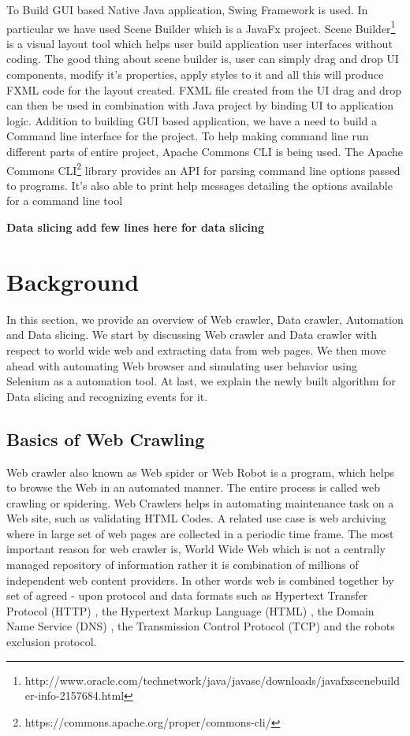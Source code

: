 \documentclass[article,type=msc,colorback,accentcolor=tud9c,twoside,11pt]{tudthesis}
\begin{document}
To Build GUI based Native Java application, Swing Framework is used. In particular we have used Scene Builder which is a JavaFx\cite{JavaFx} project. Scene Builder\footnote{http://www.oracle.com/technetwork/java/javase/downloads/javafxscenebuilder-info-2157684.html} is a visual layout tool which helps user build application user interfaces without coding. The good thing about scene builder is, user can simply drag and drop UI components, modify it's properties, apply styles to it and all this will produce FXML code for the layout created. FXML file created from the UI drag and drop can then be used in combination with Java project by binding UI to application logic. Addition to building GUI based application, we have a need to build a Command line interface for the project. To help making command line run different parts of entire project, Apache Commons CLI is being used. The Apache Commons CLI\footnote{https://commons.apache.org/proper/commons-cli/} library provides an API for parsing command line options passed to programs. It's also able to print help messages detailing the options available for a command line tool

\textbf{Data slicing add few lines here for data slicing}

\clearpage
\section{Background}
In this section, we provide an overview of Web crawler, Data crawler, Automation and Data slicing. We start by discussing Web crawler and Data crawler with respect to world wide web and extracting data from web pages. We then move ahead with automating Web browser and simulating user behavior using Selenium as a automation tool. At last, we explain the newly built algorithm for Data slicing and recognizing events for it.

\subsection{Basics of Web Crawling}

Web crawler\cite{WebCrawlerAReview} also known as Web spider or Web Robot is a program, which helps to browse the Web in an automated manner. The entire process is called web crawling or spidering. Web Crawlers helps in automating maintenance task on a Web site, such as validating HTML Codes. A related use case is web archiving where in large set of web pages are collected in a periodic time frame. The most important reason for web crawler is, World Wide Web which is not a centrally managed repository of information rather it is combination of millions of independent web content providers. In other words web is combined together by set of agreed - upon protocol and data formats such as Hypertext Transfer Protocol (HTTP) , the Hypertext Markup Language (HTML) , the Domain Name Service (DNS) , the Transmission Control Protocol (TCP) and the robots exclusion protocol. 
\end{document}
